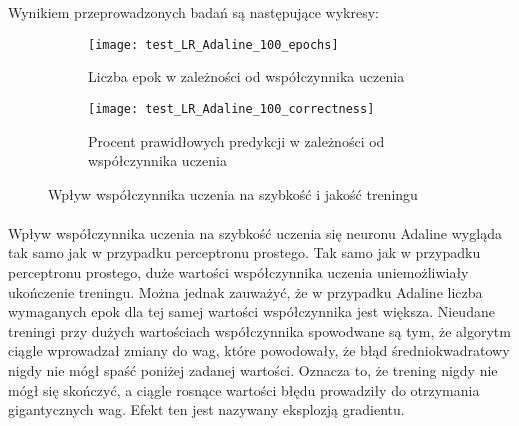\documentclass[\main/main.tex]{subfiles}
\begin{document}
    Wynikiem przeprowadzonych badań są następujące wykresy:
    
    \begin{figure}[H]
    \centering
    \begin{subfigure}{.5\textwidth}
    \centering
    \texttt{[image: test\_LR\_Adaline\_100\_epochs]}
    \caption{Liczba epok w zależności od współczynnika uczenia}
    \label{fig:lr_sp_epochs}
    \end{subfigure}%
    \begin{subfigure}{.5\textwidth}
    \centering
    \texttt{[image: test\_LR\_Adaline\_100\_correctness]}
    \caption{Procent prawidłowych predykcji w zależności od współczynnika uczenia}
    \label{fig:lr_sp_correctness}
    \end{subfigure}
    \caption{Wpływ współczynnika uczenia na szybkość i jakość treningu}
    \label{fig:test}
    \end{figure}
    
    \paragraph{}
    Wpływ współczynnika uczenia na szybkość uczenia się neuronu Adaline wygląda tak samo jak w przypadku perceptronu prostego. Tak samo jak w przypadku perceptronu prostego, duże wartości współczynnika uczenia uniemożliwiały ukończenie treningu. Można jednak zauważyć, że w przypadku Adaline liczba wymaganych epok dla tej samej wartości współczynnika jest większa. Nieudane treningi przy dużych wartościach współczynnika spowodwane są tym, że algorytm ciągle wprowadzał zmiany do wag, które powodowały, że błąd średniokwadratowy nigdy nie mógł spaść poniżej zadanej wartości. Oznacza to, że trening nigdy nie mógł się skończyć, a ciągle rosnące wartości błędu prowadziły do otrzymania gigantycznych wag. Efekt ten jest nazywany eksplozją gradientu.
    
\end{document}
